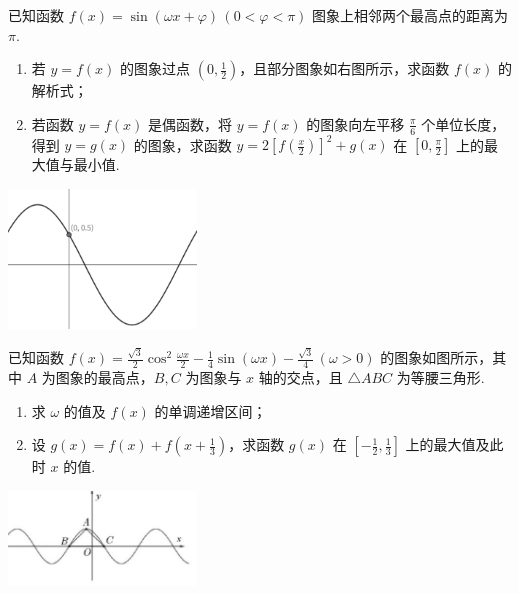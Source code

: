 \documentclass[a4paper , final]{ctexart}
\newenvironment{problemwithfig}[3][2cm]{%
  \item #2
  \par\noindent
  \begin{minipage}[t][8cm][b]{\linewidth}
    \vfill
    \hfill #3
    \par\vspace{#1} %
  \end{minipage}
}{}
\begin{document}
\begin{problems}
  \begin{problemwithfig}[5cm]
    {
      已知函数 $f(x) = \sin(\omega x + \varphi)\,(0 < \varphi < \pi)$ 图象上相邻两个最高点的距离为 $\pi$.

      \begin{enumerate}[label=(\arabic*)]
        \item 若 $y=f(x)$ 的图象过点 $(0, \frac{1}{2})$，且部分图象如右图所示，求函数 $f(x)$ 的解析式；
        \item 若函数 $y=f(x)$ 是偶函数，将 $y=f(x)$ 的图象向左平移 $\frac{\pi}{6}$ 个单位长度，得到 $y=g(x)$ 的图象，求函数 $y = 2\left[f\left(\frac{x}{2}\right)\right]^2 + g(x)$ 在 $[0, \frac{\pi}{2}]$ 上的最大值与最小值.
      \end{enumerate}
    }
    {
      \includegraphics[width=5cm]{Snipaste_2025-07-22_23-03-20.png}
    }
  \end{problemwithfig}

  \begin{problemwithfig}[5cm]
    {
      已知函数 $f(x) = \frac{\sqrt{3}}{2}\cos^2\frac{\omega x}{2} - \frac{1}{4}\sin(\omega x) - \frac{\sqrt{3}}{4}\,(\omega > 0)$ 的图象如图所示，其中 $A$ 为图象的最高点，$B, C$ 为图象与 $x$ 轴的交点，且 $\triangle ABC$ 为等腰三角形.

      \begin{enumerate}[label=(\arabic*)]
        \item 求 $\omega$ 的值及 $f(x)$ 的单调递增区间；
        \item 设 $g(x) = f(x) + f(x+\frac{1}{3})$，求函数 $g(x)$ 在 $[-\frac{1}{2}, \frac{1}{3}]$ 上的最大值及此时 $x$ 的值.
      \end{enumerate}
    }
    {
      \includegraphics[width=5cm]{Snipaste_2025-07-22_23-11-22.png}
    }
  \end{problemwithfig}


\end{problems}
\end{document}
